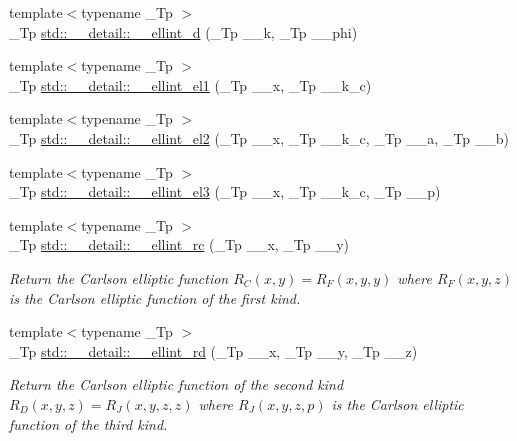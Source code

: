 \begin{DoxyCompactItemize}
\item 
{\footnotesize template$<$typename \+\_\+\+Tp $>$ }\\\+\_\+\+Tp \hyperlink{namespacestd_1_1____detail_a00da42d89830fd51e9934fe0c5e08b7f}{std\+::\+\_\+\+\_\+detail\+::\+\_\+\+\_\+ellint\+\_\+d} (\+\_\+\+Tp \+\_\+\+\_\+k, \+\_\+\+Tp \+\_\+\+\_\+phi)
\item 
{\footnotesize template$<$typename \+\_\+\+Tp $>$ }\\\+\_\+\+Tp \hyperlink{namespacestd_1_1____detail_aa17b1b382a89552f49fbb8c5eda1d50f}{std\+::\+\_\+\+\_\+detail\+::\+\_\+\+\_\+ellint\+\_\+el1} (\+\_\+\+Tp \+\_\+\+\_\+x, \+\_\+\+Tp \+\_\+\+\_\+k\+\_\+c)
\item 
{\footnotesize template$<$typename \+\_\+\+Tp $>$ }\\\+\_\+\+Tp \hyperlink{namespacestd_1_1____detail_a82449d0f05d40ba2cef6b8fc57dd5bae}{std\+::\+\_\+\+\_\+detail\+::\+\_\+\+\_\+ellint\+\_\+el2} (\+\_\+\+Tp \+\_\+\+\_\+x, \+\_\+\+Tp \+\_\+\+\_\+k\+\_\+c, \+\_\+\+Tp \+\_\+\+\_\+a, \+\_\+\+Tp \+\_\+\+\_\+b)
\item 
{\footnotesize template$<$typename \+\_\+\+Tp $>$ }\\\+\_\+\+Tp \hyperlink{namespacestd_1_1____detail_a2a2b5b80edd39b3d1f852f10c5f277fc}{std\+::\+\_\+\+\_\+detail\+::\+\_\+\+\_\+ellint\+\_\+el3} (\+\_\+\+Tp \+\_\+\+\_\+x, \+\_\+\+Tp \+\_\+\+\_\+k\+\_\+c, \+\_\+\+Tp \+\_\+\+\_\+p)
\item 
{\footnotesize template$<$typename \+\_\+\+Tp $>$ }\\\+\_\+\+Tp \hyperlink{namespacestd_1_1____detail_aa7d81e41240a6d031414c6b117889e36}{std\+::\+\_\+\+\_\+detail\+::\+\_\+\+\_\+ellint\+\_\+rc} (\+\_\+\+Tp \+\_\+\+\_\+x, \+\_\+\+Tp \+\_\+\+\_\+y)
\begin{DoxyCompactList}\small\item\em Return the Carlson elliptic function $ R_C(x,y) = R_F(x,y,y) $ where $ R_F(x,y,z) $ is the Carlson elliptic function of the first kind. \end{DoxyCompactList}\item 
{\footnotesize template$<$typename \+\_\+\+Tp $>$ }\\\+\_\+\+Tp \hyperlink{namespacestd_1_1____detail_ac05883415a662fc6f9855dd8d1da921f}{std\+::\+\_\+\+\_\+detail\+::\+\_\+\+\_\+ellint\+\_\+rd} (\+\_\+\+Tp \+\_\+\+\_\+x, \+\_\+\+Tp \+\_\+\+\_\+y, \+\_\+\+Tp \+\_\+\+\_\+z)
\begin{DoxyCompactList}\small\item\em Return the Carlson elliptic function of the second kind $ R_D(x,y,z) = R_J(x,y,z,z) $ where $ R_J(x,y,z,p) $ is the Carlson elliptic function of the third kind. \end{DoxyCompactList}\item 

\end{DoxyCompactItemize}
